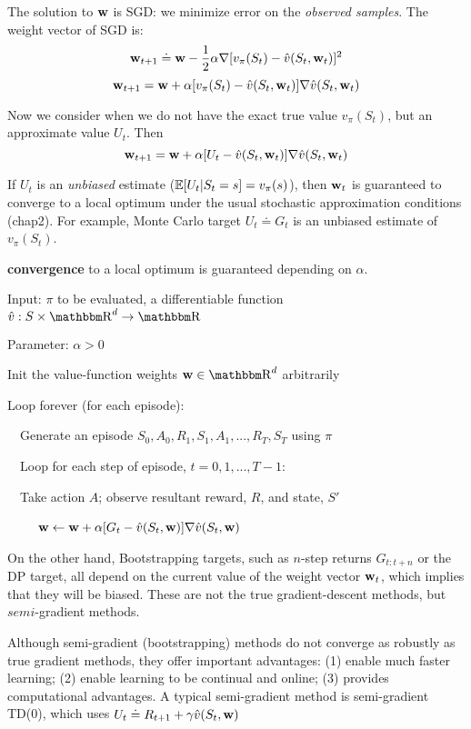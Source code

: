 \documentclass[sutton_barto_notes.tex]{subfiles}
\begin{document}
The solution to ${\operatorname*{\mathbf{w}}}$ is SGD: we minimize error on the \textit{observed samples}. The weight vector of SGD is:
$$ {\operatorname*{\mathbf{w}}}_{t+1} \doteq {\operatorname*{\mathbf{w}}} - \frac{1}{2}\alpha \nabla [v_\pi(S_t) - \hat{v}(S_t, {\operatorname*{\mathbf{w}}}_t)]^2$$
$$ {\operatorname*{\mathbf{w}}}_{t+1} = {\operatorname*{\mathbf{w}}} + \alpha[v_\pi(S_t) - \hat{v}(S_t, {\operatorname*{\mathbf{w}}}_t)]\nabla \hat{v}(S_t, {\operatorname*{\mathbf{w}}}_t) $$

Now we consider when we do not have the exact true value $v_\pi(S_t)$, but an approximate value $U_t$. Then
$$ {\operatorname*{\mathbf{w}}}_{t+1} = {\operatorname*{\mathbf{w}}} + \alpha[U_t - \hat{v}(S_t, {\operatorname*{\mathbf{w}}}_t)]\nabla \hat{v}(S_t, {\operatorname*{\mathbf{w}}}_t) $$

If $U_t$ is an \textit{unbiased} estimate ($\operatorname*{\mathbb{E}}[U_t|S_t=s]=v_\pi(s)$), then ${\operatorname*{\mathbf{w}}}_t$ is guaranteed to converge to a local optimum under the usual stochastic approximation conditions (chap2). For example, Monte Carlo target $U_t\doteq G_t$ is an unbiased estimate of $v_\pi(S_t)$.

\textbf{convergence} to a local optimum is guaranteed depending on $\alpha$.


\begin{tcolorbox}[width=1.1\textwidth,title={Gradient Monte Carlo for Estimating $\hat{v}\approx v_\pi$}]
Input: $\pi$ to be evaluated, a differentiable function $\hat{v}:S\times\R^d \rightarrow \R$

Parameter: $\alpha > 0$

Init the value-function weights ${\bw} \in \R^d$ arbitrarily

Loop forever (for each episode):

$\quad$Generate an episode $S_0, A_0, R_1, S_1, A_1, ..., R_T, S_T$ using $\pi$

$\quad$Loop for each step of episode, $t = 0,1,...,T-1$:

$\quad$Take action $A$; observe resultant reward, $R$, and state, $S'$

$\quad\quad$ ${\operatorname*{\mathbf{w}}} \leftarrow {\operatorname*{\mathbf{w}}} + \alpha [ G_t - \hat{v}(S_t, {\operatorname*{\mathbf{w}}})]\nabla \hat{v}(S_t, {\operatorname*{\mathbf{w}}})$
\end{tcolorbox}


On the other hand, Bootstrapping targets, such as $n$-step returns $G_{t:t+n}$ or the DP target, all depend on the current value of the weight vector ${\operatorname*{\mathbf{w}}}_t$, which implies that they will be biased. These are not the true gradient-descent methods, but $semi$-gradient methods.

Although semi-gradient (bootstrapping) methods do not converge as robustly as true gradient methods, they offer important advantages: (1) enable much faster learning; (2) enable learning to be continual and online; (3) provides computational advantages. A typical semi-gradient method is semi-gradient TD(0), which uses $U_t \doteq R_{t+1} + \gamma \hat{v}(S_t, {\operatorname*{\mathbf{w}}})$
\end{document}
